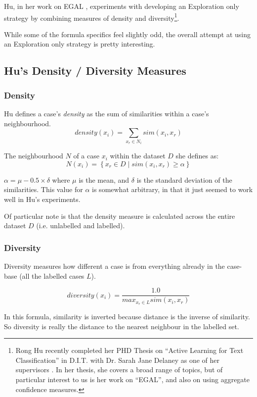 \documentclass[a4paper,11pt]{report}
\begin{document}
Hu, in her work on EGAL \citep{Hu2011}, experiments with developing an Exploration only strategy by combining measures of density and diversity\footnote{Rong Hu recently completed her PHD Thesis on ``Active Learning for Text Classification'' in D.I.T. with Dr. Sarah Jane Delaney as one of her supervisors \citep{Hu2011}. In her thesis, she covers a broad range of topics, but of particular interest to us is her work on ``EGAL'', and also on using aggregate confidence measures.}.

While some of the formula specifics feel slightly odd, the overall attempt at using an Exploration only strategy is pretty interesting. 

\subsection{Hu's Density / Diversity Measures}

\subsubsection{Density}
Hu defines a case's \emph{density} as the sum of similarities within a case's neighbourhood.
\[
density(x_{i})=\underset{x_{r}\in N_{i}}{\sum}sim(x_{i},x_{r})
\]

The neighbourhood $N$ of a case $x_{i}$ within the dataset $D$ she defines as:
\[
N(x_{i})=\left\{ x_{r}\in D\mid sim(x_{i},x_{r})\geq\alpha\right\} 
\]

$\alpha=\mu-0.5\times\delta$ where $\mu$ is the mean, and $\delta$ is the standard deviation of the similarities. This value for $\alpha$ is somewhat arbitrary, in that it just seemed to work well in Hu's experiments.

Of particular note is that the density measure is calculated across the entire dataset $D$ (i.e. unlabelled and labelled). 

\subsubsection{Diversity}

Diversity measures how different a case is from everything already in the case-base (all the labelled cases $L$).

\[
diversity(x_{i})=\frac{1.0}{max_{x_{r}\in L}sim(x_{i},x_{r})}
\]

In this formula, similarity is inverted because distance is the inverse of similarity. So diversity is really the distance to the nearest neighbour in the labelled set.
\end{document}
